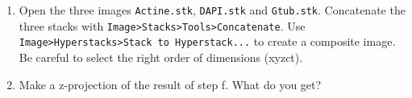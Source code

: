 \begin{enumerate}
\item Open the three images \texttt{Actine.stk}, \texttt{DAPI.stk} and \texttt{Gtub.stk}. Concatenate the three stacks with \texttt{Image>Stacks>Tools>Concatenate}. Use \texttt{Image>Hyperstacks>Stack to Hyperstack...} to
create a composite image. Be careful to select the right order of dimensions (xyzct).

\item Make a z-projection of the result of step f. What do you get?

\fbox{
	\begin{minipage}{\linewidth}
		\hfill\vspace{1cm}
	\end{minipage}
	}
	
\end{enumerate}
